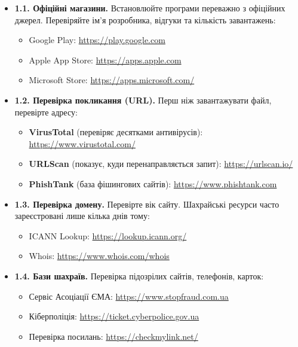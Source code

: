\begin{itemize}
    \item \textbf{1.1. Офіційні магазини.} Встановлюйте програми переважно з офіційних джерел. Перевіряйте ім’я розробника, відгуки та кількість завантажень:
    \begin{itemize}
        \item Google Play: \url{https://play.google.com}
        \item Apple App Store: \url{https://apps.apple.com}
        \item Microsoft Store: \url{https://apps.microsoft.com/}
    \end{itemize}

    \item \textbf{1.2. Перевірка покликання (URL).} Перш ніж завантажувати файл, перевірте адресу:
    \begin{itemize}
        \item \textbf{VirusTotal} (перевіряє десятками антивірусів): \url{https://www.virustotal.com/}
        \item \textbf{URLScan} (показує, куди перенаправляється запит): \url{https://urlscan.io/}
        \item \textbf{PhishTank} (база фішингових сайтів): \url{https://www.phishtank.com}
    \end{itemize}

    \item \textbf{1.3. Перевірка домену.} Перевірте вік сайту. Шахрайські ресурси часто зареєстровані лише кілька днів тому:
    \begin{itemize}
        \item ICANN Lookup: \url{https://lookup.icann.org/}
        \item Whois: \url{https://www.whois.com/whois}
    \end{itemize}

    \item \textbf{1.4. Бази шахраїв.} Перевірка підозрілих сайтів, телефонів, карток:
    \begin{itemize}
        \item Сервіс Асоціації ЄМА: \url{https://www.stopfraud.com.ua}
        \item Кіберполіція: \url{https://ticket.cyberpolice.gov.ua}
        \item Перевірка посилань: \url{https://checkmylink.net/}
    \end{itemize}
\end{itemize}

